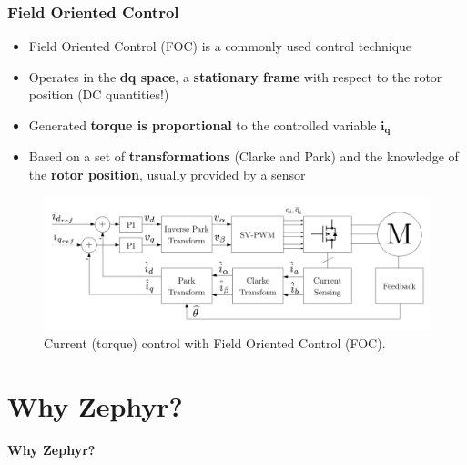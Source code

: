 \documentclass[handout]{beamer}
\begin{document}
\begin{frame}
  \frametitle{Field Oriented Control}

  \begin{itemize}
    \item<1-> Field Oriented Control (FOC) is a commonly used control technique
    \item<2-> Operates in the \textbf{dq space}, a \textbf{stationary frame}
          with respect to the rotor position (DC quantities!)
    \item<3-> Generated \textbf{torque is proportional} to the controlled
          variable $\mathbf{i_q}$
    \item<3-> Based on a set of \textbf{transformations} (Clarke and Park) and
          the knowledge of the \textbf{rotor position}, usually provided by a
          sensor
  \end{itemize}

  \begin{figure}
    \centering
    \includegraphics[scale=0.35]{cloop-full-schematic.pdf}
    \caption{Current (torque) control with Field Oriented Control (FOC).}
  \end{figure}
\end{frame}


\section{Why Zephyr?}

\begin{frame}[plain]{}
  \begin{center}
    \Huge \textbf{Why Zephyr?}
  \end{center}
\end{frame}
\end{document}
